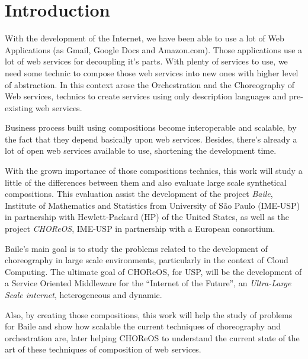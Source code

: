 \section{Introduction}

With the development of the Internet, we have been able to use a lot of Web Applications (as Gmail, Google Docs and Amazon.com). Those applications use a lot of web services for decoupling it's parts. With plenty of services to use, we need some technic to compose those web services into new ones with higher level of abstraction. In this context arose the Orchestration and the Choreography of Web services, technics to create services using only description languages and pre-existing web services.

Business process built using compositions become interoperable and scalable, by the fact that they depend basically upon web services. Besides, there's already a lot of open web services available to use, shortening the development time.

With the grown importance of those compositions technics, this work will study a little of the differences between them and also evaluate large scale synthetical compositions. This evaluation assist the development of the project \emph{Baile}, Institute of Mathematics and Statistics from University of São Paulo (IME-USP) in partnership with Hewlett-Packard (HP) of the United States, as well as the project \emph{CHOReOS}, IME-USP in partnership with a European consortium.

Baile’s main goal is to study the problems related to the development of choreography in large scale environments, particularly in the context of Cloud Computing. The ultimate goal of CHOReOS, for USP, will be the development of a Service Oriented Middleware for the ``Internet of the Future'', an \emph{Ultra-Large Scale internet}, heterogeneous and dynamic.

Also, by creating those compositions, this work will help the study of problems for Baile and show how scalable the current techniques of choreography and orchestration are, later helping CHOReOS to understand the current state of the art of these techniques of composition of web services.